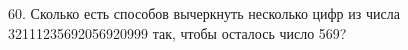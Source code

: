 60. Сколько есть способов вычеркнуть несколько цифр из числа 32111235692056920999 так, чтобы осталось число 569?\\
